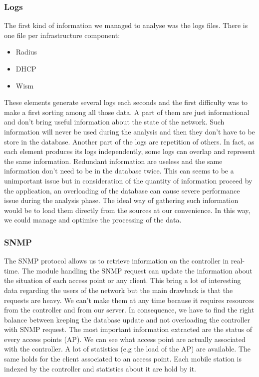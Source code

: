 \subsubsection{Logs}
The first kind of information we managed to analyse was the logs files. There is one file per infrastructure component:
\begin{itemize}
\item Radius
\item DHCP
\item Wism
\end{itemize}
These elements generate several logs each seconds and the first difficulty was to make a first sorting among all those data. A part of them are just informational and don't bring useful information about the state of the network. Such information will never be used during the analysis and then they don't have to be store in the database. Another part of the logs are repetition of others. In fact, as each element produces its logs independently, some logs can overlap and represent the same information. Redundant information are useless and the same information don't need to be in the database twice. This can seems to be a unimportant issue but in consideration of the quantity of information proceed by the application, an overloading of the database can cause severe performance issue during the analysis phase.
The ideal way of gathering such information would be to load them directly from the sources at our convenience. In this way, we could manage and optimise the processing of the data.

\subsubsection{SNMP}
The SNMP protocol allows us to retrieve information on the controller in real-time. The module handling the SNMP request can update the information about the situation of each access point or any client. This bring a lot of interesting data regarding the users of the network but the main drawback is that the requests are heavy. We can't make them at any time because it requires resources from the controller and from our server. In consequence, we have to find the right balance between keeping the database update and not overloading the controller with SNMP request.
The most important information extracted are the status of every access points (AP). We can see what access point are actually associated with the controller. A lot of statistics (e.g the load of the AP) are available.
The same holds for the client associated to an access point. Each mobile station is indexed by the controller and statistics about it are hold by it.

